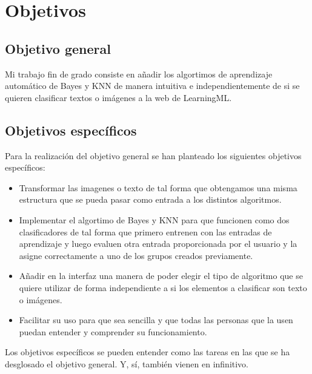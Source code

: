 \documentclass[a4paper, 12pt]{book}
\begin{document}

\cleardoublepage %
\chapter{Objetivos} %
\label{chap:objetivos} %

\section{Objetivo general} %
\label{sec:objetivo-general} %

Mi trabajo fin de grado consiste en añadir los algortimos de aprendizaje automático de Bayes y KNN de manera intuitiva e independientemente de si se quieren clasificar textos o imágenes a la web de LearningML.

\section{Objetivos específicos}
\label{sec:objetivos-especificos}

Para la realización del objetivo general se han planteado los siguientes objetivos específicos:
\begin{itemize}
  
	\item Transformar las imagenes o texto de tal forma que obtengamos una misma estructura que se pueda pasar como entrada a los distintos algoritmos.
 
	\item Implementar el algortimo de Bayes y KNN para que funcionen como dos clasificadores de tal forma que primero entrenen con las entradas de aprendizaje y luego evaluen otra entrada proporcionada por el usuario y la asigne correctamente a uno de los grupos creados previamente.
  
	\item Añadir en la interfaz una manera de poder elegir el tipo de algoritmo que se quiere utilizar de forma independiente a si los elementos a clasificar son texto o imágenes.

	\item Facilitar su uso para que sea sencilla y que todas las personas que la usen puedan entender y comprender su funcionamiento.

\end{itemize}
Los objetivos específicos se pueden entender como las tareas en las que se ha desglosado el objetivo general.
Y, sí, también vienen en infinitivo.
\end{document}
